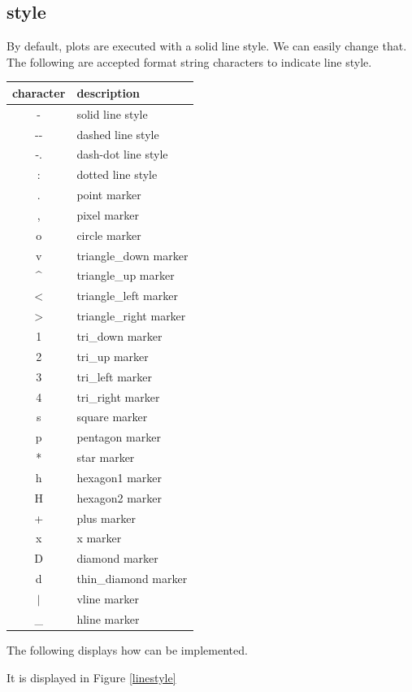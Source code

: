 \subsection*{style}
By default, plots are executed with a solid line style. 
We can easily change that. 
The following are accepted format string characters to indicate line style. 

\begin{tabular}
{|c||l|}
\hline
character & description \\
\hline
- & solid line style \\
-{}- & dashed line style\\
-. & dash-dot line style \\
: & dotted line style \\
. & point marker \\
, & pixel marker \\
o & circle marker \\
v & triangle\_down marker \\
\^{} & triangle\_up marker \\
$<$ & triangle\_left marker \\
$>$ & triangle\_right marker \\
1 & tri\_down marker \\
2 & tri\_up marker \\
3 & tri\_left marker \\
4 & tri\_right marker \\
s & square marker \\
p & pentagon marker \\
* & star marker \\
h & hexagon1 marker \\
H & hexagon2 marker \\
+ & plus marker \\
x & x marker \\
D & diamond marker \\
d & thin\_diamond marker \\
$|$ & vline marker \\
\_{} & hline marker \\
\hline 
\end{tabular}


The following displays how  can be  implemented. 

It is displayed in Figure \ref{linestyle}


